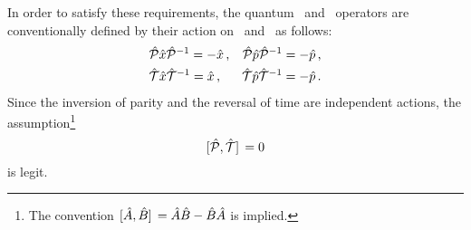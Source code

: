         In order to satisfy these requirements, the quantum \hP\ and \hT\ operators are conventionally defined by their action on \hx\ and \hp\ as follows:
        \begin{align}
            \label{eq:quantum-P}
            &\mathcal{\hat{P}}\hat{x}\mathcal{\hat{P}}^{-1} = -\hat{x}
            \,\text{,}
            &\mathcal{\hat{P}}\hat{p}\mathcal{\hat{P}}^{-1} = -\hat{p}
            \,\text{,}
            \\
            \label{eq:quantum-T}
            &\mathcal{\hat{T}}\hat{x}\mathcal{\hat{T}}^{-1} = \hat{x}
            \,\text{,}
            &\mathcal{\hat{T}}\hat{p}\mathcal{\hat{T}}^{-1} = -\hat{p}
            \,\text{.}
        \end{align}
        Since the inversion of parity and the reversal of time are independent actions, the assumption\footnote{The convention $\comm*{\hA}{\togglehat{B}} = \hA\togglehat{B} - \togglehat{B}\hA$ is implied.}
        \begin{equation}
            \label{eq:PT-commutator}
            \comm*{\hP}{\hT} = 0 
        \end{equation}
        is legit.

